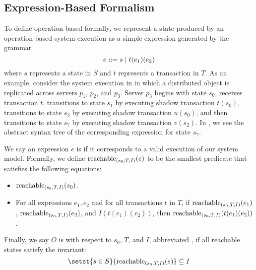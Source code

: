 \subsection{Expression-Based Formalism}
To define operation-based \invariantconfluence{} formally, we represent a state
produced by an operation-based system execution as a simple expression
generated by the grammar
%
\[
  \hfill
  e ::= s \mid t(e_1)(e_2)
  \hfill
\]
%
where $s$ represents a state in $S$ and $t$ represents a transaction in $T$. As
an example, consider the system execution in  in
which a distributed object is replicated across servers $p_1$, $p_2$, and
$p_3$. Server $p_3$ begins with state $s_0$, receives transaction $t$,
transitions to state $s_1$ by executing shadow transaction $t(s_0)$,
transitions to state $s_3$ by executing shadow transaction $u(s_0)$, and then
transitions to state $s_7$ by executing shadow transaction $v(s_2)$.  In
, we see the abstract syntax tree of the corresponding
expression for state $s_7$.

{}

We say an expression $e$ is  if it corresponds to a
valid execution of our system model. Formally, we define
$\text{reachable}_{(s_0, T, I)}(e)$ to be the smallest predicate that satisfies the
following equations:
\begin{itemize}
  \item
    $\text{reachable}_{(s_0, T, I)}(s_0)$.
  \item
    For all expressions $e_1, e_2$ and for all transactions $t$ in $T$, if
    $\text{reachable}_{(s_0, T, I)}(e_1)$, $\text{reachable}_{(s_0, T, I)}(e_2)$, and
    $I(t(e_1)(e_2))$, then $\text{reachable}_{(s_0, T, I)}(t(e_1)(e_2))$.
\end{itemize}

Finally, we say $O$ is \invariantconfluent{} with respect to $s_0$, $T$, and
$I$, abbreviated \sTIconfluent{}, if all reachable states satisfy the
invariant:
\[
  \hfill
  \setst{s \in S}{\sTIreachablepredicate{s}} \subseteq I
  \hfill
\]
